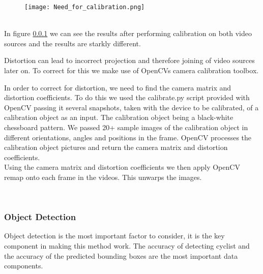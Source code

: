 \begin{figure}[h]
  \texttt{[image: Need\_for\_calibration.png]}
  \centering 
  \end{figure}
  \label{joined_distortion}
\ \\

In figure \ref{} we can see the results after performing calibration on both video sources and the results are starkly different.

Distortion can lead to incorrect projection and therefore joining of video sources later on.
To correct for this we make use of OpenCVs \cite{noauthor_opencv/opencv_2021} camera calibration toolbox.

In order to correct for distortion, we need to find the camera matrix and distortion coefficients. To do this we used the calibrate.py script provided with OpenCV
passing it several snapshots, taken with the device to be calibrated, of a calibration object as an input. The calibration object being a black-white chessboard pattern.
We passed 20+ sample images of the calibration object in different orientations, angles and positions in the frame. OpenCV processes the calibration object pictures and
return the camera matrix and distortion coefficients.
\ \\
Using the camera matrix and distortion coefficients we then apply OpenCV remap onto each frame in the videos. This unwarps the images.

\ \\
\subsubsection{Object Detection}

Object detection is the most important factor to consider, it is the key component in making this method work. The accuracy of detecting cyclist and the accuracy of the
predicted bounding boxes are the most important data components.

